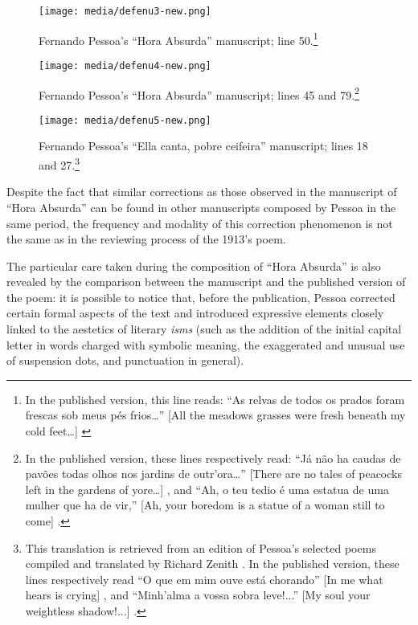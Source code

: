 \documentclass{article}
\begin{document}
\begin{figure}
    \centering
    \texttt{[image: media/defenu3-new.png]}
    \caption{Fernando Pessoa's ``Hora Absurda'' manuscript; line 50.\footnote{In the published version, this line  reads: ``As relvas de todos os prados foram frescas sob meus pés frios\ldots{}'' [All the meadows grasses were fresh beneath my cold feet\ldots] \parencite[42; line 50]{pessoa_mensagem_2018}}
    } 
    \label{fig:defenu3-new}
\end{figure}


\begin{figure}
    \centering
    \texttt{[image: media/defenu4-new.png]}
    \caption{Fernando Pessoa's ``Hora Absurda'' manuscript; lines 45 and 79.\footnote{In the published version, these lines respectively read: ``Já não ha caudas de pavões todas olhos nos jardins de outr'ora\ldots{}'' [There are no tales of peacocks left in the gardens of yore\ldots] \mancite\parencite[42; line 45]{pessoa_mensagem_2018}, and ``Ah, o teu tedio é uma estatua de uma mulher que ha de vir,'' [Ah, your boredom is a statue of a woman still to come] \parencite[43; line 79]{pessoa_mensagem_2018}.}
    } 
    \label{fig:defenu4-new}
\end{figure}



\begin{figure}
    \centering
    \texttt{[image: media/defenu5-new.png]}
    \caption{Fernando Pessoa's ``Ella canta, pobre ceifeira'' manuscript; lines 18 and 27.\footnote{This translation is
    retrieved from an edition of Pessoa's selected poems compiled and
    translated by Richard Zenith \citep{pessoa_little_2006}. In the published version, these lines respectively read ``O que em mim ouve está chorando'' [In me what hears is crying] \parencite[45; line 18]{pessoa_mensagem_2018}, and ``Minh'alma a vossa sobra leve!...'' [My soul your weightless shadow!...] \parencite[45; line 27]{pessoa_mensagem_2018}.}
  } 
    \label{fig:defenu5-new}
\end{figure}

Despite the fact that similar corrections as those observed in the
manuscript of ``Hora Absurda'' can be found in other manuscripts
composed by Pessoa in the same period, the frequency and modality of
this correction phenomenon is not the same as in the reviewing process
of the 1913's poem.

The particular care taken during the composition of ``Hora Absurda'' is
also revealed by the comparison between the manuscript and the published
version of the poem: it is possible to notice that, before the
publication, Pessoa corrected certain formal aspects of the text and
introduced expressive elements closely linked to the aestetics of
literary \emph{isms} (such as the addition of the initial capital letter
in words charged with symbolic meaning, the exaggerated and unusual use
of suspension dots, and punctuation in general).
\end{document}
